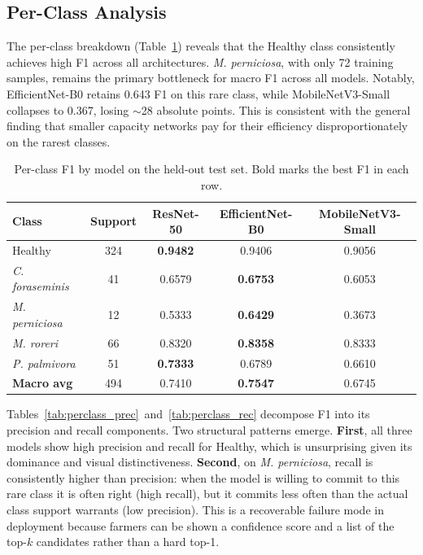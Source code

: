 \documentclass[conference,10pt]{IEEEtran}
\begin{document}
\subsection{Per-Class Analysis}

The per-class breakdown (Table~\ref{tab:perclass}) reveals that the Healthy
class consistently achieves high F1 across all architectures.
\textit{M. perniciosa}, with only 72 training samples, remains the primary
bottleneck for macro F1 across all models. Notably, EfficientNet-B0 retains
0.643 F1 on this rare class, while MobileNetV3-Small collapses to 0.367,
losing $\sim$28 absolute points. This is consistent with the general finding
that smaller capacity networks pay for their efficiency disproportionately on
the rarest classes.

\begin{table}[t]
\centering
\caption{Per-class F1 by model on the held-out test set. Bold marks the best
F1 in each row.}
\label{tab:perclass}
\renewcommand{\arraystretch}{1.15}
\begin{tabular}{lcccc}
\toprule
\textbf{Class} & \textbf{Support} & \textbf{ResNet-50} & \textbf{EfficientNet-B0} & \textbf{MobileNetV3-Small} \\
\midrule
Healthy                  & 324 & \textbf{0.9482} & 0.9406 & 0.9056 \\
\textit{C. foraseminis}  &  41 & 0.6579 & \textbf{0.6753} & 0.6053 \\
\textit{M. perniciosa}   &  12 & 0.5333 & \textbf{0.6429} & 0.3673 \\
\textit{M. roreri}       &  66 & 0.8320 & \textbf{0.8358} & 0.8333 \\
\textit{P. palmivora}    &  51 & \textbf{0.7333} & 0.6789 & 0.6610 \\
\midrule
\textbf{Macro avg}       & 494 & 0.7410 & \textbf{0.7547} & 0.6745 \\
\bottomrule
\end{tabular}
\end{table}

Tables~\ref{tab:perclass_prec}~and~\ref{tab:perclass_rec} decompose F1 into
its precision and recall components. Two structural patterns emerge.
\textbf{First}, all three models show high precision and recall for Healthy,
which is unsurprising given its dominance and visual distinctiveness.
\textbf{Second}, on \textit{M. perniciosa}, recall is consistently higher
than precision: when the model is willing to commit to this rare class it is
often right (high recall), but it commits less often than the actual class
support warrants (low precision). This is a recoverable failure mode in
deployment because farmers can be shown a confidence score and a list of the
top-$k$ candidates rather than a hard top-1.
\end{document}
